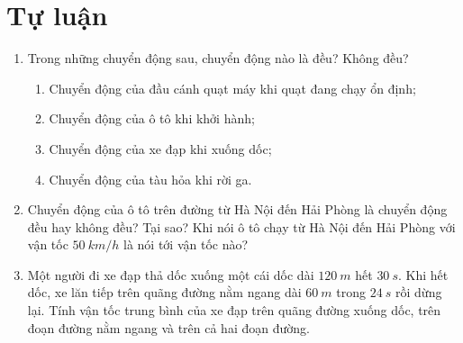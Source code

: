 \section{Tự luận}
\begin{enumerate}[label=\bfseries Câu \arabic*:]
	\item {}
	
	{
		Trong những chuyển động sau, chuyển động nào là đều? Không đều?
		\begin{enumerate}
			\item Chuyển động của đầu cánh quạt máy khi quạt đang chạy ổn định;
			\item Chuyển động của ô tô khi khởi hành;
			\item Chuyển động của xe đạp khi xuống dốc;
			\item Chuyển động của tàu hỏa khi rời ga.
		\end{enumerate}
	}
	
	
	\item {}
	
	{Chuyển động của ô tô trên đường từ Hà Nội đến Hải Phòng là chuyển động đều hay không đều? Tại sao? Khi nói ô tô chạy từ Hà Nội đến Hải Phòng với vận tốc $\SI{50}{km/h}$ là nói tới vận tốc nào?}
	\item {}
	
	
	{Một người đi xe đạp thả dốc xuống một cái dốc dài $\SI{120}{m}$ hết $\SI{30}{s}$. Khi hết dốc, xe lăn tiếp trên quãng đường nằm ngang dài $\SI{60}{m}$ trong $\SI{24}{s}$ rồi dừng lại. Tính vận tốc trung bình của xe đạp trên quãng đường xuống dốc, trên đoạn đường nằm ngang và trên cả hai đoạn đường.
	}
	

\end{enumerate}
